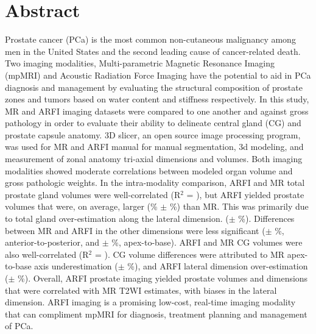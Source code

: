 \section*{Abstract}
Prostate cancer (PCa) is the most common non-cutaneous malignancy among men in
the United States and the second leading cause of cancer-related death.  Two
imaging modalities, Multi-parametric Magnetic Resonance Imaging (mpMRI) and
Acoustic Radiation Force Imaging have the potential to aid in PCa diagnosis and
management by evaluating the structural composition of prostate zones and
tumors based on water content and stiffness respectively.  In this study,
\invivo MR and ARFI imaging datasets were compared to one another and against
gross pathology in order to evaluate their ability to delineate central gland
(CG) and prostate capsule anatomy. 3D slicer, an open source image processing
program,  was used for MR and ARFI manual for manual segmentation, 3d modeling,
and measurement of zonal anatomy tri-axial dimensions and volumes.   Both
imaging modalities showed moderate correlations between modeled organ volume
and gross pathologic weights.  In the intra-modality comparison, ARFI and MR
total prostate gland volumes were well-correlated (R$^2$ = \MRarfiVolTotalRsq),
but ARFI yielded prostate volumes that were, on average, larger
(\MRarfiVolTotalMeanDiff\% $\pm$ \MRarfiVolTotalStdDiff\%) than MR. This was
primarily due to total gland over-estimation along the lateral dimension.
(\ARFImrTotalLatLatMeanPct $\pm$ \ARFImrTotalLatLatStdPct\%). Differences
between MR and ARFI in the other dimensions were less significant
(\ARFImrTotalAntPostMeanPct $\pm$ \ARFImrTotalAntPostStdPct\%,
anterior-to-posterior, and \ARFImrTotalApexBaseMeanPct $\pm$
\ARFImrTotalApexBaseStdPct\%, apex-to-base). ARFI and MR CG volumes were also
well-correlated (R$^2$ = \MRarfiVolCentralRsq).  CG volume differences were
attributed to MR apex-to-base axis underestimation
(\ARFImrCentralApexBaseMeanPct $\pm$ \ARFImrCentralApexBaseStdPct\%), and ARFI
lateral dimension over-estimation  (\ARFImrCentralLatLatMeanPct $\pm$
\ARFImrCentralLatLatStdPct\%).  Overall, ARFI prostate imaging yielded prostate
volumes and dimensions that were correlated with MR T2WI estimates, with biases
in the lateral dimension. ARFI imaging is a promising low-cost, real-time
imaging modality that can compliment mpMRI for diagnosis, treatment planning
and management of PCa.
